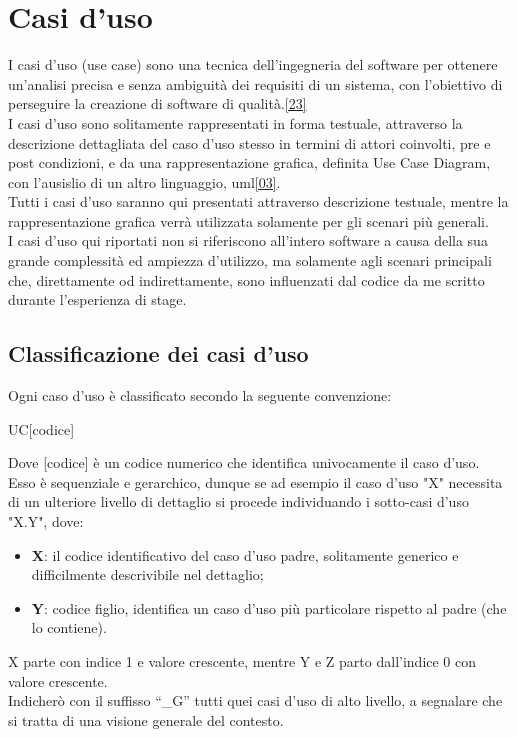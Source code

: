 \section{Casi d'uso}
I casi d'uso (use case) sono una tecnica dell'ingegneria del software per ottenere un'analisi precisa e senza ambiguità dei requisiti di un sistema, con l'obiettivo di perseguire la creazione di software di qualità.\hyperlink{23}{[23]}\\
I casi d'uso sono solitamente rappresentati in forma testuale, attraverso la descrizione dettagliata del caso d'uso stesso in termini di attori coinvolti, pre e post condizioni, e da una rappresentazione grafica, definita Use Case Diagram, con l'ausislio di un altro linguaggio, \gls{uml}\glsfirstoccur\hyperlink{03}{[03]}.\\
Tutti i casi d'uso saranno qui presentati attraverso descrizione testuale, mentre la rappresentazione grafica verrà utilizzata solamente per gli scenari più generali.\\
I casi d'uso qui riportati non si riferiscono all'intero software a causa della sua grande complessità ed ampiezza d'utilizzo, ma solamente agli scenari principali che, direttamente od indirettamente, sono influenzati dal codice da me scritto durante l'esperienza di stage.\\

\newpage

\subsection{Classificazione dei casi d'uso}
Ogni caso d’uso è classificato secondo la seguente convenzione:
\begin{center}
	UC[codice]
\end{center}
Dove [codice] è un codice numerico che identifica univocamente il caso d’uso.\\
Esso è sequenziale e gerarchico, dunque se ad esempio il caso d’uso "X" necessita di un ulteriore livello di dettaglio si procede individuando i sotto-casi d’uso "X.Y", dove:\\
\begin{itemize}
	\item \textbf{X}: il codice identificativo del caso d'uso padre, solitamente generico e difficilmente descrivibile nel dettaglio; 
	\item \textbf{Y}: codice figlio, identifica un caso d'uso più particolare rispetto al padre (che lo contiene).
	
\end{itemize}
X parte con indice 1 e valore crescente, mentre Y e Z parto dall'indice 0 con valore crescente.\\
Indicherò con il suffisso “\_G” tutti quei casi d’uso di alto livello, a segnalare che si tratta di una visione generale del contesto.

